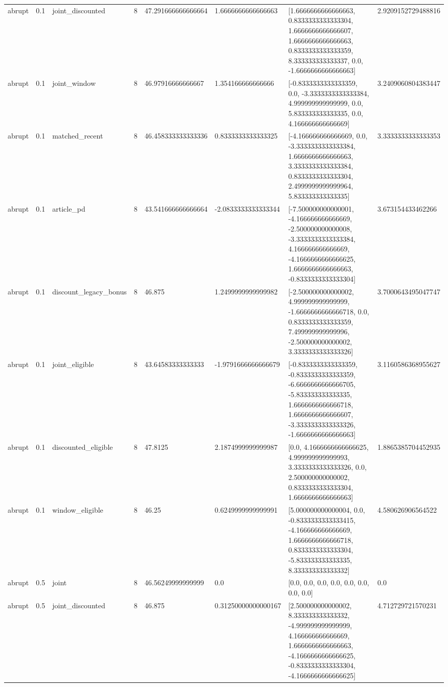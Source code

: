 \begin{tabular}{llllllll}
abrupt & 0.1 & joint\_discounted & 8 & 47.291666666666664 & 1.6666666666666663 & [1.6666666666666663, 0.8333333333333304, 1.6666666666666607, 1.6666666666666663, 0.8333333333333359, 8.333333333333337, 0.0, -1.6666666666666663] & 2.9209152729488816 \\
abrupt & 0.1 & joint\_window & 8 & 46.97916666666667 & 1.354166666666666 & [-0.8333333333333359, 0.0, -3.3333333333333384, 4.999999999999999, 0.0, 5.833333333333335, 0.0, 4.166666666666669] & 3.2409060804383447 \\
abrupt & 0.1 & matched\_recent & 8 & 46.458333333333336 & 0.8333333333333325 & [-4.166666666666669, 0.0, -3.3333333333333384, 1.6666666666666663, 3.3333333333333384, 0.8333333333333304, 2.4999999999999964, 5.833333333333335] & 3.3333333333333353 \\
abrupt & 0.1 & article\_pd & 8 & 43.541666666666664 & -2.0833333333333344 & [-7.500000000000001, -4.166666666666669, -2.500000000000008, -3.3333333333333384, 4.166666666666669, -4.1666666666666625, 1.6666666666666663, -0.8333333333333304] & 3.673154433462266 \\
abrupt & 0.1 & discount\_legacy\_bonus & 8 & 46.875 & 1.2499999999999982 & [-2.500000000000002, 4.999999999999999, -1.6666666666666718, 0.0, 0.8333333333333359, 7.499999999999996, -2.500000000000002, 3.3333333333333326] & 3.7000643495047747 \\
abrupt & 0.1 & joint\_eligible & 8 & 43.64583333333333 & -1.9791666666666679 & [-0.8333333333333359, -0.8333333333333359, -6.6666666666666705, -5.833333333333335, 1.6666666666666718, 1.6666666666666607, -3.3333333333333326, -1.6666666666666663] & 3.1160586368955627 \\
abrupt & 0.1 & discounted\_eligible & 8 & 47.8125 & 2.1874999999999987 & [0.0, 4.1666666666666625, 4.999999999999993, 3.3333333333333326, 0.0, 2.500000000000002, 0.8333333333333304, 1.6666666666666663] & 1.8865385704452935 \\
abrupt & 0.1 & window\_eligible & 8 & 46.25 & 0.6249999999999991 & [5.000000000000004, 0.0, -0.8333333333333415, -4.166666666666669, 1.6666666666666718, 0.8333333333333304, -5.833333333333335, 8.333333333333332] & 4.580626906564522 \\
abrupt & 0.5 & joint & 8 & 46.56249999999999 & 0.0 & [0.0, 0.0, 0.0, 0.0, 0.0, 0.0, 0.0, 0.0] & 0.0 \\
abrupt & 0.5 & joint\_discounted & 8 & 46.875 & 0.31250000000000167 & [2.500000000000002, 8.333333333333332, -4.999999999999999, 4.166666666666669, 1.6666666666666663, -4.1666666666666625, -0.8333333333333304, -4.1666666666666625] & 4.712729721570231 \\

\end{tabular}

